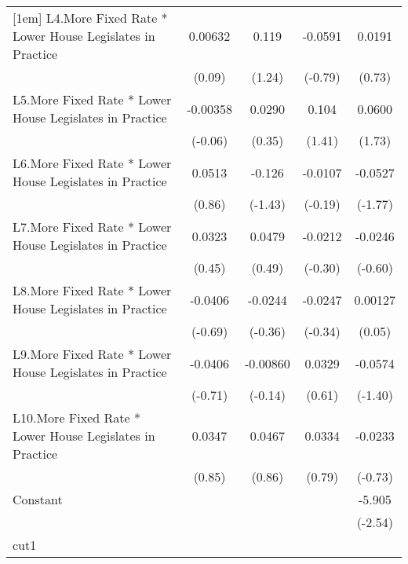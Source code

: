 {\begin{longtable}{l*{4}{c}}
[1em]
L4.More Fixed Rate * Lower House Legislates in Practice&  0.00632         &    0.119         &  -0.0591         &   0.0191         \\
                &   (0.09)         &   (1.24)         &  (-0.79)         &   (0.73)         \\
[1em]
L5.More Fixed Rate * Lower House Legislates in Practice& -0.00358         &   0.0290         &    0.104         &   0.0600         \\
                &  (-0.06)         &   (0.35)         &   (1.41)         &   (1.73)         \\
[1em]
L6.More Fixed Rate * Lower House Legislates in Practice&   0.0513         &   -0.126         &  -0.0107         &  -0.0527         \\
                &   (0.86)         &  (-1.43)         &  (-0.19)         &  (-1.77)         \\
[1em]
L7.More Fixed Rate * Lower House Legislates in Practice&   0.0323         &   0.0479         &  -0.0212         &  -0.0246         \\
                &   (0.45)         &   (0.49)         &  (-0.30)         &  (-0.60)         \\
[1em]
L8.More Fixed Rate * Lower House Legislates in Practice&  -0.0406         &  -0.0244         &  -0.0247         &  0.00127         \\
                &  (-0.69)         &  (-0.36)         &  (-0.34)         &   (0.05)         \\
[1em]
L9.More Fixed Rate * Lower House Legislates in Practice&  -0.0406         & -0.00860         &   0.0329         &  -0.0574         \\
                &  (-0.71)         &  (-0.14)         &   (0.61)         &  (-1.40)         \\
[1em]
L10.More Fixed Rate * Lower House Legislates in Practice&   0.0347         &   0.0467         &   0.0334         &  -0.0233         \\
                &   (0.85)         &   (0.86)         &   (0.79)         &  (-0.73)         \\
[1em]
Constant        &                  &                  &                  &   -5.905\sym{*}  \\
                &                  &                  &                  &  (-2.54)         \\
\hline
cut1            &                  &                  &                  &                  \\

\end{longtable}}
